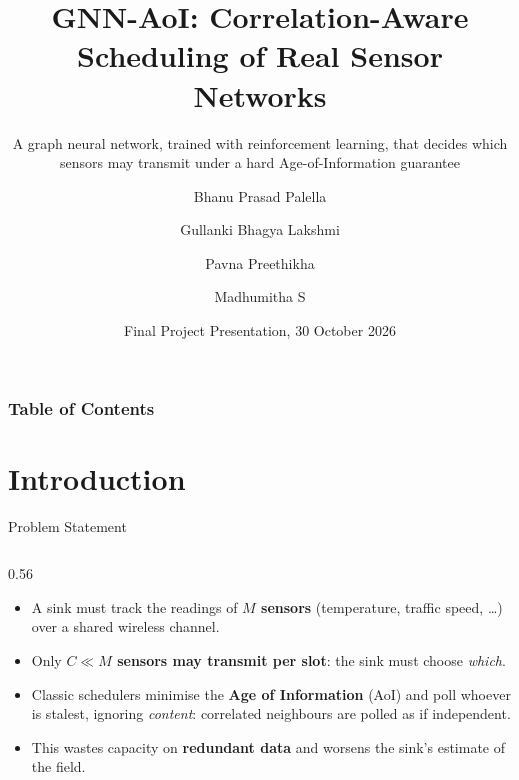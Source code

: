 \documentclass[aspectratio=169,10pt,xcolor=table]{beamer}
\title[GNN-AoI] %
{GNN-AoI: Correlation-Aware Scheduling of Real Sensor Networks}
\subtitle{A graph neural network, trained with reinforcement learning, that decides which sensors may transmit under a hard Age-of-Information guarantee}
\author[Palella, Gullanki, Preethikha, Madhumitha] %
{Bhanu Prasad Palella \and Gullanki Bhagya Lakshmi \and Pavna Preethikha \and Madhumitha S}
\institute[ASAI] %
{
  Amrita School of Artificial Intelligence
}
\date[30 October 2026] %
{Final Project Presentation, 30 October 2026}
\newcommand{\hl}[1]{{\color{accent}\textbf{#1}}}
\begin{document}
\frame{\titlepage}

\begin{frame}
\frametitle{Table of Contents}
\tableofcontents
\end{frame}

\section{Introduction}

\begin{frame}{Problem Statement}
  \begin{columns}[T]
    \begin{column}{0.56\textwidth}
      \begin{itemize}\setlength\itemsep{0.45em}
        \item A sink must track the readings of \hl{$M$ sensors} (temperature, traffic speed, \dots)
              over a shared wireless channel.
        \item Only \hl{$C \ll M$ sensors may transmit per slot}: the sink must choose \emph{which}.
        \item Classic schedulers minimise the \hl{Age of Information} (AoI) and poll whoever is stalest,
              ignoring \emph{content}: correlated neighbours are polled as if independent.
        \item This wastes capacity on \textbf{redundant data} and worsens the sink's estimate of the field.
      \end{itemize}
      \vspace{0.2em}


\end{column}
\end{columns}
\end{frame}
\end{document}
